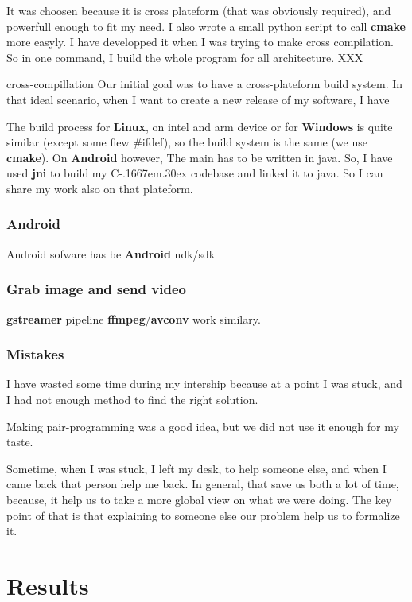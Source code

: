 \documentclass[a4paper,11pt]{custom}
\newcommand{\avconv}{\textbf{avconv}}
\newcommand{\ffmpeg}{\textbf{ffmpeg}}
\newcommand{\gstreamer}{\textbf{gstreamer}}
\newcommand{\cmake}{\textbf{cmake}}
\newcommand{\jni}{\textbf{jni}}
\newcommand{\linux}{\textbf{Linux}}
\newcommand{\win}{\textbf{Windows}}
\newcommand{\android}{\textbf{Android}}
\newcommand{\cpp}{%
  C\kern-.1667em\raise.30ex\hbox{\smaller{++}}%
  \spacefactor1000%
}
\begin{document}
It was choosen because it is
cross plateform (that was obviously required), and powerfull enough to fit my
need. I also wrote a small python script to call \cmake{} more easyly. I have
developped it when I was trying to make cross compilation. So in one command, I
build the whole program for all architecture. XXX

cross-compillation
Our initial goal was to have a cross-plateform build system. In that ideal
scenario, when I want to create a new release of my software, I have

The build process for \linux, on intel and arm device or for \win{} is quite
similar (except some fiew \#ifdef), so the build system is the same (we use
\cmake). On \android{} however, The main has to be written in java. So, I have
used \jni{} to build my \cpp{} codebase and linked it to java. So I can share my
work also on that plateform.

\subsection{Android}

Android sofware has be
\android{} ndk/sdk

\subsection{Grab image and send video}

\gstreamer{} pipeline
\ffmpeg/\avconv{} work similary.

\subsection{Mistakes}

I have wasted some time during my intership because at a point I was stuck, and
I had not enough method to find the right solution.

Making pair-programming was a good idea, but we did not use it enough for my
taste.

Sometime, when I was stuck, I left my desk, to help someone else, and when I
came back that person help me back. In general, that save us both a lot of time,
because, it help us to take a more global view on what we were doing. The key
point of that is that explaining to someone else our problem help us to
formalize it.

\chapter{Results}
\end{document}
